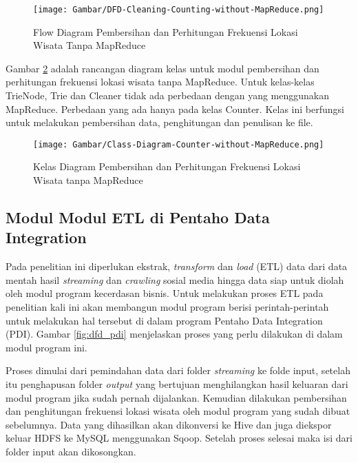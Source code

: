 \begin{figure}[H]
	\centering
	\texttt{[image: Gambar/DFD-Cleaning-Counting-without-MapReduce.png]}
	\caption[Flow Diagram Pembersihan dan Perhitungan Frekuensi Lokasi Wisata Tanpa MapReduce]{Flow Diagram Pembersihan dan Perhitungan Frekuensi Lokasi Wisata Tanpa MapReduce} 
	\label{fig:flow_frekuensi_tanpa_mapreduce}
\end{figure}

Gambar \ref{fig:class_frekuensi_tanpa_mapreduce} adalah rancangan diagram kelas untuk modul pembersihan dan perhitungan frekuensi lokasi wisata tanpa MapReduce. Untuk kelas-kelas TrieNode, Trie dan Cleaner tidak ada perbedaan dengan yang menggunakan MapReduce. Perbedaan yang ada hanya pada kelas Counter. Kelas ini berfungsi untuk melakukan pembersihan data, penghitungan dan penulisan ke file.

\begin{figure}[H]
	\centering
	\texttt{[image: Gambar/Class-Diagram-Counter-without-MapReduce.png]}
	\caption[Kelas Diagram Pembersihan dan Perhitungan Frekuensi Lokasi Wisata tanpa MapReduce]{Kelas Diagram Pembersihan dan Perhitungan Frekuensi Lokasi Wisata tanpa MapReduce} 
	\label{fig:class_frekuensi_tanpa_mapreduce}
\end{figure}

\subsection{Modul Modul ETL di Pentaho Data Integration}
Pada penelitian ini diperlukan ekstrak, \textit{transform} dan \textit{load} (ETL) data dari data mentah hasil \textit{streaming} dan \textit{crawling} sosial media hingga data siap untuk diolah oleh modul program kecerdasan bisnis. Untuk melakukan proses ETL pada penelitian kali ini akan membangun modul program berisi perintah-perintah untuk melakukan hal tersebut di dalam program Pentaho Data Integration (PDI). Gambar \ref{fig:dfd_pdi} menjelaskan proses yang perlu dilakukan di dalam modul program ini. 

Proses dimulai dari pemindahan data dari folder \textit{streaming} ke folde input, setelah itu penghapusan folder \textit{output} yang bertujuan menghilangkan hasil keluaran dari modul program jika sudah pernah dijalankan. Kemudian dilakukan pembersihan dan penghitungan frekuensi lokasi wisata oleh modul program yang sudah dibuat sebelumnya. Data yang dihasilkan akan dikonversi ke Hive dan juga diekspor keluar HDFS ke MySQL menggunakan Sqoop. Setelah proses selesai maka isi dari folder input akan dikosongkan.

